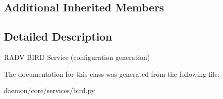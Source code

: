 \subsection*{Additional Inherited Members}


\subsection{Detailed Description}
\begin{DoxyVerb}RADV BIRD Service (configuration generation)\end{DoxyVerb}
 

The documentation for this class was generated from the following file\+:\begin{DoxyCompactItemize}
\item 
daemon/core/services/bird.\+py\end{DoxyCompactItemize}
